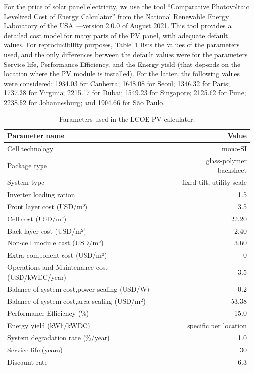 For the price of solar panel electricity, we use the tool ``Comparative Photovoltaic Levelized Cost of Energy Calculator'' from the National Renewable Energy Laboratory of the USA \cite{pv_lcoe_calc}---version 2.0.0 of August 2021. This tool provides a detailed cost model for many parts of the PV panel, with adequate default values. For reproducibility purposes, Table~\ref{tab:parameters_pv_LCOE} lists the values of the parameters used, and the only differences between the default values were for the parameters Service life, Performance Efficiency, and the Energy yield (that depends on the location where the PV module is installed). For the latter, the following values were considered:   1934.03 for Canberra;  1648.08 for Seoul; 1346.32 for Paris; 1737.38 for Virginia; 2215.17 for Dubai; 1549.23 for Singapore; 2125.62 for Pune;  2238.52 for Johannesburg; and 1904.66 for São Paulo.
\begin{table}[h]
  
  \caption{Parameters used in the LCOE PV calculator.}\label{tab:parameters_pv_LCOE} \centering

  \begin{tabular}{|l|r|}
    \hline    
    \textbf{Parameter name} &   \textbf{Value} \\
    \hline
    Cell technology & mono-SI  \\
    \hline
    Package type  & glass-polymer backsheet \\
    \hline
    System type  & fixed tilt, utility scale \\
    \hline
    Inverter loading ration  & 1.5 \\
    \hline
    Front layer cost (USD/m²)   &  3.5 \\
    \hline
    Cell  cost (USD/m²)   &  22.20 \\
    \hline
    Back layer cost (USD/m²)   & 2.40 \\
    \hline
    Non-cell module cost (USD/m²)   &  13.60 \\
    \hline
    Extra component cost (USD/m²)   &  0 \\
    \hline
    Operations and Maintenance cost  (USD/kWDC/year)   &  3.5 \\
    \hline  
    Balance of system cost,power-scaling  (USD/W)   &  0.2 \\
    \hline  
    Balance of system cost,area-scaling  (USD/m²)   &  53.38 \\
    \hline  
    Performance Efficiency (\%) & 15.0  \\
    \hline
    Energy yield (kWh/kWDC) & specific per location \\
    \hline
    System degradation rate (\%/year)  & 1.0 \\
    \hline
    Service life (years) & 30 \\
    \hline
    Discount rate & 6.3 \\
    \hline
    

  \end{tabular}  
\end{table}


